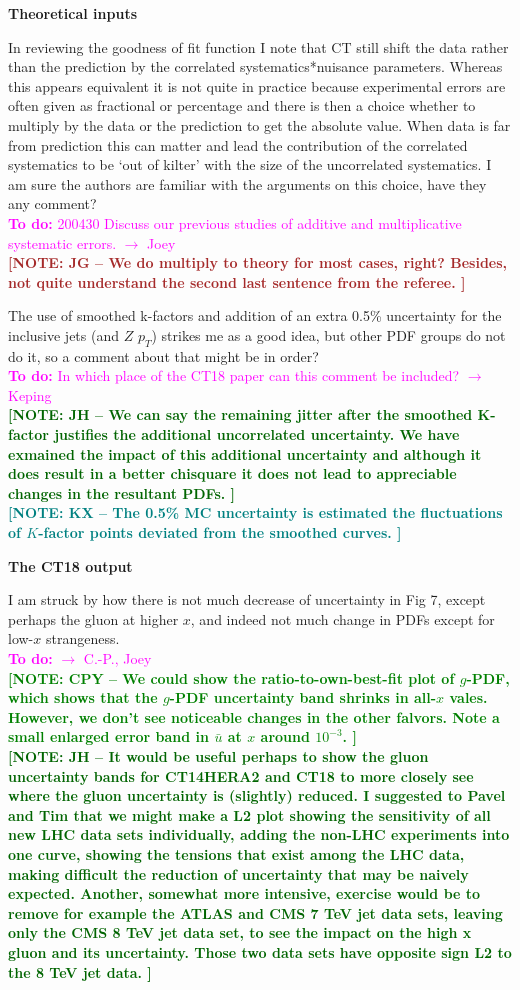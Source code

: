 \documentclass[aps,prd,amsmath,nofootinbib,floatfix,fleqn]{revtex4}
\newcommand{\TODO}[1]{\textcolor{magenta}{
\quad\vspace{3pt} \\ {\bf To do:} #1 \\
}}
\newcommand{\NOTECPY}[1]{\textcolor{green}{ \bf[NOTE: CPY -- #1 ]}}
\newcommand{\NOTEJH}[1]{\textcolor{darkgreen}{ \bf[NOTE: JH -- #1 ]}}
\newcommand{\NOTEJG}[1]{\textcolor{brown}{ \bf[NOTE: JG -- #1 ]}}
\newcommand{\NOTEKX}[1]{\textcolor{teal}{ \bf[NOTE: KX -- #1 ]}}
\begin{document}
{\bf Theoretical inputs}


In reviewing the goodness of fit function I note that CT still shift the data rather than the prediction by the correlated systematics*nuisance parameters. Whereas this appears equivalent it is not quite in practice because experimental errors are often given as fractional or percentage and there is then a choice whether to multiply by the data or the prediction to get the absolute value. When data is far from prediction this can matter and lead the contribution of the correlated systematics to be ‘out of kilter’ with the size of the uncorrelated systematics. I am sure the authors are familiar with the arguments on this choice, have they any comment? 
\TODO{200430 Discuss our previous studies of additive and multiplicative systematic errors. $\to$ Joey}
\NOTEJG{We do multiply to theory for most cases, right? Besides, not quite understand the second last sentence from the referee.}

\noindent
The use of smoothed k-factors and addition of an extra 0.5\% uncertainty for the inclusive jets (and $Z$ $p_T$) strikes me as a good idea, but other PDF groups do not do it, so a comment about that might be in order?
\TODO{In which place of the CT18 paper can this comment be included? $\to$ Keping}
\NOTEJH{We can say the remaining jitter after the smoothed K-factor justifies the additional uncorrelated uncertainty. We have exmained the impact of this additional uncertainty and although it does result in a better chisquare it does not lead to appreciable changes in the resultant PDFs.}\\
\NOTEKX{The 0.5\% MC uncertainty is estimated the fluctuations of $K$-factor points deviated from the smoothed curves.}

{\bf The CT18 output}

I am struck by how there is not much decrease of uncertainty in Fig 7, except perhaps the gluon at higher $x$, and indeed not much change in PDFs except for low-$x$ strangeness.
\TODO{$\to$ C.-P., Joey}
\NOTECPY{We could show the ratio-to-own-best-fit plot of $g$-PDF, which shows that the $g$-PDF uncertainty band shrinks in all-$x$ vales. 
However, we don't see noticeable changes in the other falvors. Note a small enlarged error band in ${\bar u}$ at $x$ around $10^{-3}$.}\\
\NOTEJH{It would be useful perhaps to show the gluon uncertainty bands for CT14HERA2 and CT18 to more closely see where the gluon uncertainty is
(slightly) reduced. I suggested to Pavel and Tim that we might make a L2 plot showing the sensitivity of all new LHC data sets individually, adding the non-LHC experiments into one curve, showing the tensions that exist among the LHC data, making difficult the reduction of uncertainty that may be naively expected. Another, somewhat more intensive, exercise would be to remove for example the ATLAS and CMS 7 TeV jet data sets, leaving only the CMS 8 TeV jet data set, to see the impact on the high x gluon and its uncertainty. Those two data sets have opposite sign L2 to the 8 TeV jet data. }
\end{document}

